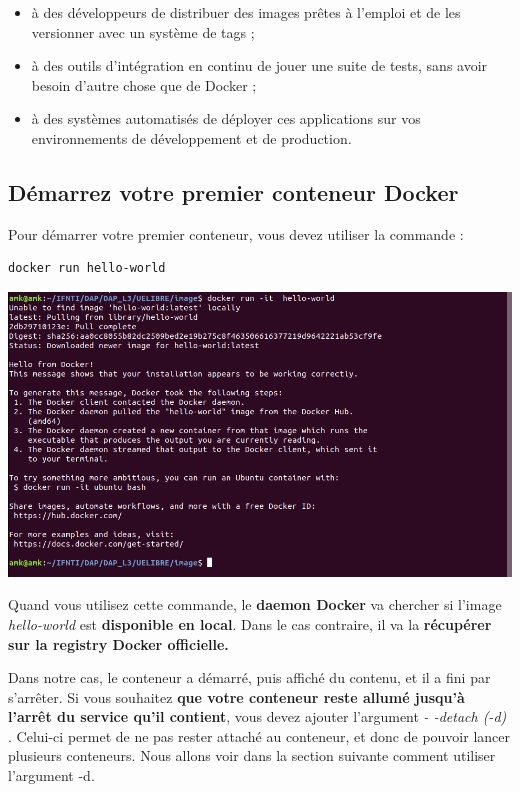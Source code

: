 \documentclass[12pt,a4paper]{article}
\begin{document}
\begin{itemize}
\item à des développeurs de distribuer des images prêtes à l’emploi et de les versionner avec un système de tags ;
\item à des outils d’intégration en continu de jouer une suite de tests, sans avoir besoin d’autre chose que de Docker ;
\item à des systèmes automatisés de déployer ces applications sur vos environnements de développement et de production.
\end{itemize}

\subsection{Démarrez votre premier conteneur Docker}
Pour démarrer votre premier conteneur, vous devez utiliser la commande :
\begin{verbatim}
docker run hello-world
\end{verbatim}
\begin{center}
\includegraphics[scale=0.3]{img/p_conteneur.png}
\end{center}
Quand vous utilisez cette commande, le \textbf{daemon Docker} va chercher si l'image \textit{hello-world} est \textbf{disponible en local}. Dans le cas contraire, il va la \textbf{récupérer sur la registry Docker officielle.}

Dans notre cas, le conteneur a démarré, puis affiché du contenu, et il a fini par s'arrêter. Si vous souhaitez \textbf{que votre conteneur reste allumé jusqu’à l'arrêt du service qu'il contient}, vous devez ajouter l’argument \textit{- -detach (-d)} . Celui-ci permet de ne pas rester attaché au conteneur, et donc de pouvoir lancer plusieurs conteneurs. Nous allons voir dans la section suivante comment utiliser l’argument -d.
\end{document}
